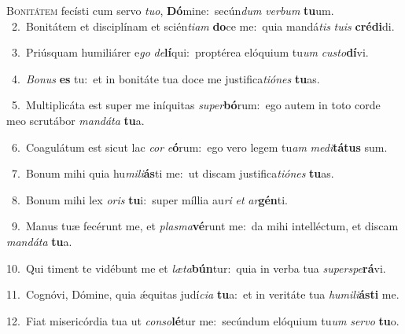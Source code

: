 \lettrine{\initial\textcolor{\initialcolor}{B}}{onitátem} fecísti cum servo \textit{tu}\-\textit{o}, \textbf{Dó}\-mine:~\star secún\textit{dum} \textit{ver}\-\textit{bum} \textbf{tu}\-um.\\
{\numbfont\textcolor{\numbcolor}{~2.}}~Bonitátem et disciplínam et scién\-\textit{ti}\-\textit{am} \textbf{do}\-ce me:~\star quia mandá\textit{tis} \textit{tu}\-\textit{is} \textbf{cré}\-\textbf{di}di.\par
{\numbfont\textcolor{\numbcolor}{~3.}}~Priúsquam humiliárer e\textit{go} \textit{de}\-\textbf{lí}qui:~\star proptérea elóquium tu\textit{um} \textit{cus}\-\textit{to}\textbf{dí}vi.\par
{\numbfont\textcolor{\numbcolor}{~4.}}~\-\textit{Bo}\-\textit{nus} \textbf{es} tu:~\star et in bonitáte tua doce me justifica\-\textit{ti}\-\textit{ó}\textit{nes} \textbf{tu}\-as.\par
{\numbfont\textcolor{\numbcolor}{~5.}}~Multiplicáta est super me iníquitas \textit{su}\-\textit{per}\textbf{bó}rum:~\star ego autem in toto corde meo scrutábor \textit{man}\-\textit{dá}\textit{ta} \textbf{tu}\-a.\par
{\numbfont\textcolor{\numbcolor}{~6.}}~Coagulátum est sicut lac \textit{cor} \textit{e}\-\textbf{ó}rum:~\star ego vero legem tu\textit{am} \textit{me}\-\textit{di}\textbf{tá}\textbf{tus} sum.\par
{\numbfont\textcolor{\numbcolor}{~7.}}~Bonum mihi quia hu\-\textit{mi}\-\textit{li}\textbf{ás}ti me:~\star ut discam justifica\-\textit{ti}\-\textit{ó}\textit{nes} \textbf{tu}\-as.\par
{\numbfont\textcolor{\numbcolor}{~8.}}~Bonum mihi lex \textit{o}\-\textit{ris} \textbf{tu}\-i:~\star super míllia au\textit{ri} \textit{et} \textit{ar}\-\textbf{gén}ti.\par
{\numbfont\textcolor{\numbcolor}{~9.}}~Manus tuæ fecérunt me, et \textit{plas}\-\textit{ma}\textbf{vé}runt me:~\star da mihi intelléctum, et discam \textit{man}\-\textit{dá}\textit{ta} \textbf{tu}\-a.\par
{\numbfont\textcolor{\numbcolor}{10.}}~Qui timent te vidébunt me et \textit{læ}\-\textit{ta}\textbf{bún}tur:~\star quia in verba tua \textit{su}\-\textit{per}\textit{spe}\textbf{rá}vi.\par
{\numbfont\textcolor{\numbcolor}{11.}}~Cognóvi, Dómine, quia ǽquitas judí\-\textit{ci}\-\textit{a} \textbf{tu}\-a:~\star et in veritáte tua \textit{hu}\-\textit{mi}\textit{li}\textbf{ás}\textbf{ti} me.\par
{\numbfont\textcolor{\numbcolor}{12.}}~Fiat misericórdia tua ut \textit{con}\-\textit{so}\textbf{lé}tur me:~\star secúndum elóquium tu\textit{um} \textit{ser}\-\textit{vo} \textbf{tu}\-o.\par
